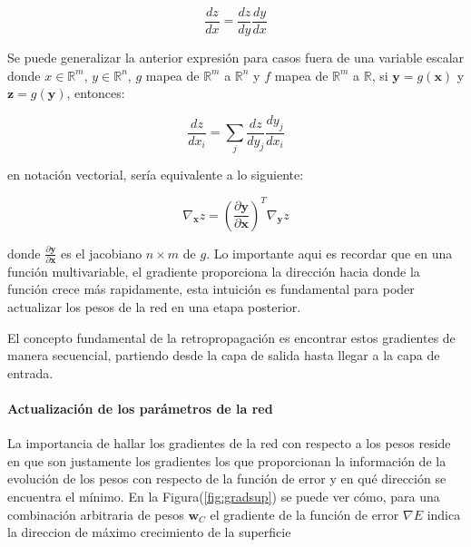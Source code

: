         \begin{equation}
            \frac{dz}{dx} = \frac{dz}{dy} \frac{dy}{dx}
        \end{equation}

        Se puede generalizar la anterior expresión para casos fuera de una variable escalar donde $x \in \mathbb{R}^m$, 
        $y \in \mathbb{R}^n$, $g$ mapea de $\mathbb{R}^m$ a $\mathbb{R}^n$ y $f$ mapea de $\mathbb{R}^m$ a $\mathbb{R}$,
        si $\mathbf{y} = g(\mathbf{x})$ y $\mathbf{z} = g(\mathbf{y})$, entonces:

        \begin{equation}
            \frac{dz}{dx_i} =\sum_j \frac{dz}{dy_j} \frac{dy_j}{dx_i}
        \end{equation}

        en notación vectorial, sería equivalente a lo siguiente:

        \begin{equation}
            \nabla_{\mathbf{x}}z = \left( \frac{\partial \mathbf{y}}{\partial \mathbf{x}} \right)^T \nabla_{\mathbf{y}} z
        \end{equation}

        donde $\frac{\partial \mathbf{y}}{\partial \mathbf{x}}$ es el jacobiano $n \times m$ de $g$. Lo importante aqui 
        es recordar que en una función multivariable, el gradiente proporciona la dirección hacia donde la función crece 
        más rapidamente, esta intuición es fundamental para poder actualizar los pesos de la red en una etapa posterior.

        El concepto fundamental de la retropropagación es encontrar estos gradientes de manera secuencial, partiendo desde 
        la capa de salida hasta llegar a la capa de entrada. 

            \paragraph{Actualización de los parámetros de la red}
            La importancia de hallar los gradientes de la red con respecto a los pesos reside en que son justamente 
            los gradientes los que proporcionan la información de la evolución de los pesos con respecto de la función 
            de error y en qué dirección se encuentra el mínimo. En la Figura(\ref{fig:gradsup}) se puede ver cómo, para 
            una combinación arbitraria de pesos $\mathbf{w}_C$ el gradiente de la función de error $\nabla E$ indica 
            la direccion de máximo crecimiento de la superficie

